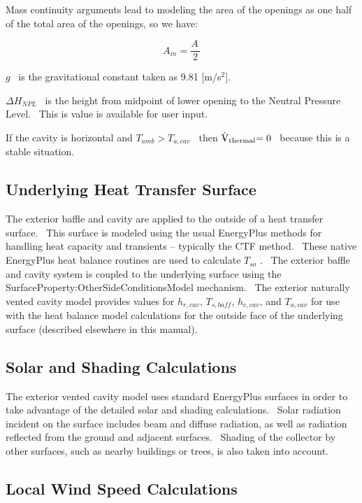 Mass continuity arguments lead to modeling the area of the openings as one half of the total area of the openings, so we have:

\begin{equation}
{A_{in}} = \frac{{A\,}}{2}
\end{equation}

\(g\) ~is the gravitational constant taken as 9.81 {[}m/s\(^{2}\){]}.

\(\Delta {H_{NPL}}\) ~is the height from midpoint of lower opening to the Neutral Pressure Level.~ This is value is available for user input.

If the cavity is horizontal and \(T_{amb} > T_{a,cav}\) ~then \({{\rm{\rlap{--} \dot V}}_{{\rm{thermal}}}}{\rm{ = 0}}\) ~because this is a stable situation.

\subsection{Underlying Heat Transfer Surface}\label{underlying-heat-transfer-surface}

The exterior baffle and cavity are applied to the outside of a heat transfer surface.~ This surface is modeled using the usual EnergyPlus methods for handling heat capacity and transients -- typically the CTF method.~ These native EnergyPlus heat balance routines are used to calculate \({T_{so}}\) .~ The exterior baffle and cavity system is coupled to the underlying surface using the SurfaceProperty:OtherSideConditionsModel mechanism.~ The exterior naturally vented cavity model provides values for \({h_{r,cav}}\), \({T_{s,baff}}\), \({h_{c,cav}}\), and \({T_{a,cav}}\) for use with the heat balance model calculations for the outside face of the underlying surface (described elsewhere in this manual).

\subsection{Solar and Shading Calculations}\label{solar-and-shading-calculations}

The exterior vented cavity model uses standard EnergyPlus surfaces in order to take advantage of the detailed solar and shading calculations.~ Solar radiation incident on the surface includes beam and diffuse radiation, as well as radiation reflected from the ground and adjacent surfaces.~ Shading of the collector by other surfaces, such as nearby buildings or trees, is also taken into account.

\subsection{Local Wind Speed Calculations}\label{local-wind-speed-calculations}

